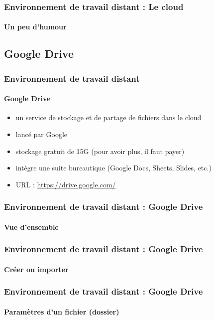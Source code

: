\documentclass[xcolor=table]{beamer}
\begin{document}
\begin{frame}
\frametitle{Environnement de travail distant : Le cloud}
\framesubtitle{Un peu d'humour}

\begin{center}
\end{center}

\end{frame}

\subsection{Google Drive}

\begin{frame}
\frametitle{Environnement de travail distant}
\framesubtitle{Google Drive}

\begin{itemize}
	\item un service de stockage et de partage de fichiers dans le cloud
	\item lancé par Google
	\item stockage gratuit de 15G (pour avoir plus, il faut payer)
	\item intègre une suite bureautique (Google Docs, Sheets, Slides, etc.)
	\item URL : \url{https://drive.google.com/}
\end{itemize}

\end{frame}


\begin{frame}
\frametitle{Environnement de travail distant : Google Drive}
\framesubtitle{Vue d'ensemble}

\begin{center}
\end{center}

\end{frame}

\begin{frame}
\frametitle{Environnement de travail distant : Google Drive}
\framesubtitle{Créer ou importer}

\begin{center}
\end{center}

\end{frame}

\begin{frame}
\frametitle{Environnement de travail distant : Google Drive}
\framesubtitle{Paramètres d'un fichier (dossier)}

\begin{center}
\end{center}

\end{frame}
\end{document}
